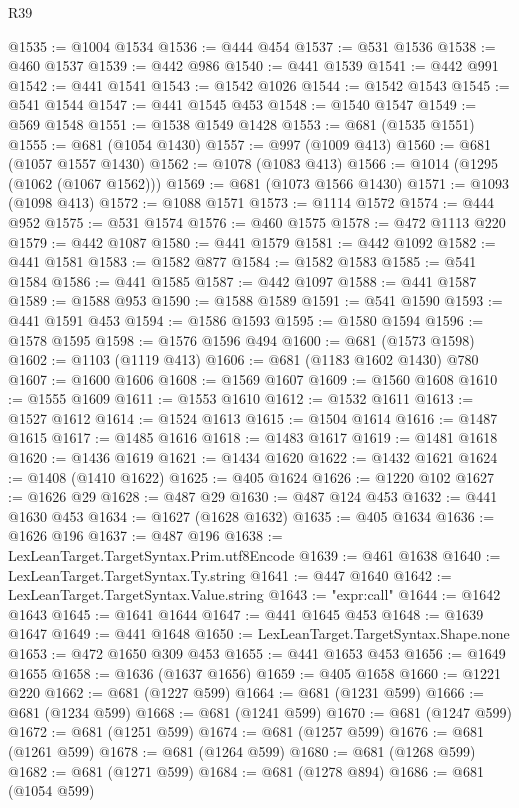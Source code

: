 \begin{lexlean}{R39}
\begin{coremodule}
@1535 := @1004 @1534
@1536 := @444 @454
@1537 := @531 @1536
@1538 := @460 @1537
@1539 := @442 @986
@1540 := @441 @1539
@1541 := @442 @991
@1542 := @441 @1541
@1543 := @1542 @1026
@1544 := @1542 @1543
@1545 := @541 @1544
@1547 := @441 @1545 @453
@1548 := @1540 @1547
@1549 := @569 @1548
@1551 := @1538 @1549 @1428
@1553 := @681 (@1535 @1551)
@1555 := @681 (@1054 @1430)
@1557 := @997 (@1009 @413)
@1560 := @681 (@1057 @1557 @1430)
@1562 := @1078 (@1083 @413)
@1566 := @1014 (@1295 (@1062 (@1067 @1562)))
@1569 := @681 (@1073 @1566 @1430)
@1571 := @1093 (@1098 @413)
@1572 := @1088 @1571
@1573 := @1114 @1572
@1574 := @444 @952
@1575 := @531 @1574
@1576 := @460 @1575
@1578 := @472 @1113 @220
@1579 := @442 @1087
@1580 := @441 @1579
@1581 := @442 @1092
@1582 := @441 @1581
@1583 := @1582 @877
@1584 := @1582 @1583
@1585 := @541 @1584
@1586 := @441 @1585
@1587 := @442 @1097
@1588 := @441 @1587
@1589 := @1588 @953
@1590 := @1588 @1589
@1591 := @541 @1590
@1593 := @441 @1591 @453
@1594 := @1586 @1593
@1595 := @1580 @1594
@1596 := @1578 @1595
@1598 := @1576 @1596 @494
@1600 := @681 (@1573 @1598)
@1602 := @1103 (@1119 @413)
@1606 := @681 (@1183 @1602 @1430) @780
@1607 := @1600 @1606
@1608 := @1569 @1607
@1609 := @1560 @1608
@1610 := @1555 @1609
@1611 := @1553 @1610
@1612 := @1532 @1611
@1613 := @1527 @1612
@1614 := @1524 @1613
@1615 := @1504 @1614
@1616 := @1487 @1615
@1617 := @1485 @1616
@1618 := @1483 @1617
@1619 := @1481 @1618
@1620 := @1436 @1619
@1621 := @1434 @1620
@1622 := @1432 @1621
@1624 := @1408 (@1410 @1622)
@1625 := @405 @1624
@1626 := @1220 @102
@1627 := @1626 @29
@1628 := @487 @29
@1630 := @487 @124 @453
@1632 := @441 @1630 @453
@1634 := @1627 (@1628 @1632)
@1635 := @405 @1634
@1636 := @1626 @196
@1637 := @487 @196
@1638 := LexLeanTarget.TargetSyntax.Prim.utf8Encode
@1639 := @461 @1638
@1640 := LexLeanTarget.TargetSyntax.Ty.string
@1641 := @447 @1640
@1642 := LexLeanTarget.TargetSyntax.Value.string
@1643 := "expr:call"
@1644 := @1642 @1643
@1645 := @1641 @1644
@1647 := @441 @1645 @453
@1648 := @1639 @1647
@1649 := @441 @1648
@1650 := LexLeanTarget.TargetSyntax.Shape.none
@1653 := @472 @1650 @309 @453
@1655 := @441 @1653 @453
@1656 := @1649 @1655
@1658 := @1636 (@1637 @1656)
@1659 := @405 @1658
@1660 := @1221 @220
@1662 := @681 (@1227 @599)
@1664 := @681 (@1231 @599)
@1666 := @681 (@1234 @599)
@1668 := @681 (@1241 @599)
@1670 := @681 (@1247 @599)
@1672 := @681 (@1251 @599)
@1674 := @681 (@1257 @599)
@1676 := @681 (@1261 @599)
@1678 := @681 (@1264 @599)
@1680 := @681 (@1268 @599)
@1682 := @681 (@1271 @599)
@1684 := @681 (@1278 @894)
@1686 := @681 (@1054 @599)

\end{coremodule}
\end{lexlean}
